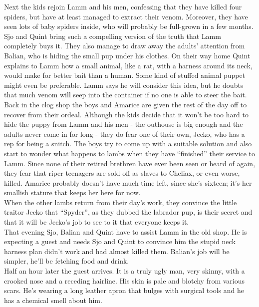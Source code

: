 Next the kids rejoin Lamm and his men, confessing that they have killed four spiders, but have at least managed to extract their venom. Moreover, they have seen lots of baby spiders inside, who will probably be full-grown in a few months. Sjo and Quint bring such a compelling version of the truth that Lamm completely buys it. They also manage to draw away the adults' attention from Balian, who is hiding the small pup under his clothes. On their way home Quint explains to Lamm how a small animal, like a rat, with a harness around its neck, would make for better bait than a human. Some kind of stuffed animal puppet might even be preferable. Lamm says he will consider this idea, but he doubts that much venom will seep into the container if no one is able to steer the bait.\\

Back in the clog shop the boys and Amarice are given the rest of the day off to recover from their ordeal. Although the kids decide that it won't be too hard to hide the puppy from Lamm and his men - the outhouse is big enough and the adults never come in for long - they do fear one of their own, Jecko, who has a rep for being a snitch. The boys try to come up with a suitable solution and also start to wonder what happens to lambs when they have ``finished'' their service to Lamm. Since none of their retired brethren have ever been seen or heard of again, they fear that riper teenagers are sold off as slaves to Cheliax, or even worse, killed. Amarice probably doesn't have much time left, since she's sixteen; it's her smallish stature that keeps her here for now.\\

When the other lambs return from their day's work, they convince the little traitor Jecko that ``Spyder'', as they dubbed the labrador pup, is their secret and that it will be Jecko's job to see to it that everyone keeps it.\\

That evening Sjo, Balian and Quint have to assist Lamm in the old shop. He is expecting a guest and needs Sjo and Quint to convince him the stupid neck harness plan didn't work and had almost killed them. Balian's job will be simpler, he'll be fetching food and drink.\\

Half an hour later the guest arrives. It is a truly ugly man, very skinny, with a crooked nose and a receding hairline. His skin is pale and blotchy from various scars. He's wearing a long leather apron that bulges with surgical tools and he has a chemical smell about him.\\

